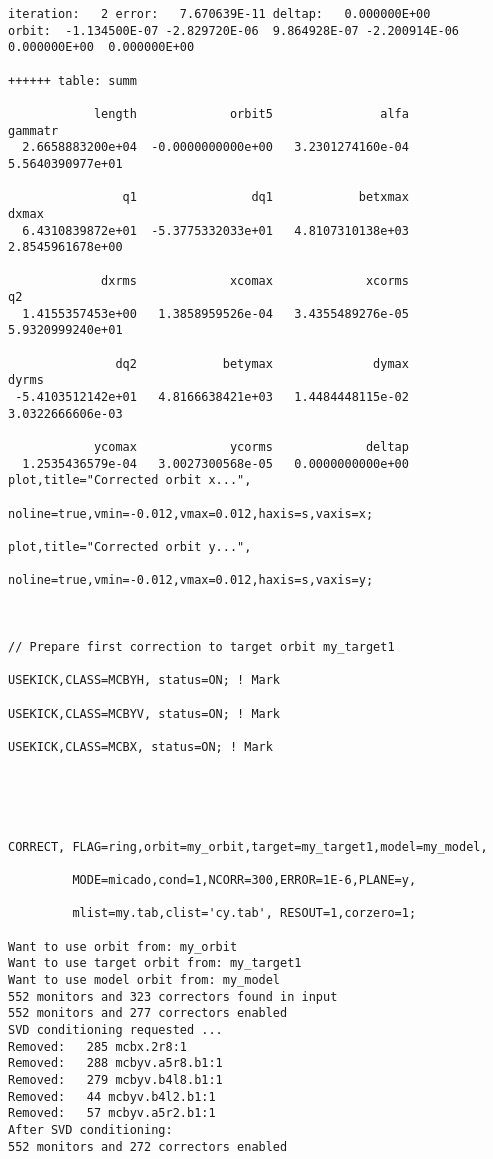 \begin{verbatim}
iteration:   2 error:   7.670639E-11 deltap:   0.000000E+00
orbit:  -1.134500E-07 -2.829720E-06  9.864928E-07 -2.200914E-06  0.000000E+00  0.000000E+00

++++++ table: summ

            length             orbit5               alfa            gammatr 
  2.6658883200e+04  -0.0000000000e+00   3.2301274160e-04   5.5640390977e+01 

                q1                dq1            betxmax              dxmax 
  6.4310839872e+01  -5.3775332033e+01   4.8107310138e+03   2.8545961678e+00 

             dxrms             xcomax             xcorms                 q2 
  1.4155357453e+00   1.3858959526e-04   3.4355489276e-05   5.9320999240e+01 

               dq2            betymax              dymax              dyrms 
 -5.4103512142e+01   4.8166638421e+03   1.4484448115e-02   3.0322666606e-03 

            ycomax             ycorms             deltap 
  1.2535436579e-04   3.0027300568e-05   0.0000000000e+00 
plot,title="Corrected orbit x...",

noline=true,vmin=-0.012,vmax=0.012,haxis=s,vaxis=x;

plot,title="Corrected orbit y...",

noline=true,vmin=-0.012,vmax=0.012,haxis=s,vaxis=y;



// Prepare first correction to target orbit my_target1

USEKICK,CLASS=MCBYH, status=ON; ! Mark

USEKICK,CLASS=MCBYV, status=ON; ! Mark

USEKICK,CLASS=MCBX, status=ON; ! Mark





CORRECT, FLAG=ring,orbit=my_orbit,target=my_target1,model=my_model,

         MODE=micado,cond=1,NCORR=300,ERROR=1E-6,PLANE=y,

         mlist=my.tab,clist='cy.tab', RESOUT=1,corzero=1;

Want to use orbit from: my_orbit
Want to use target orbit from: my_target1
Want to use model orbit from: my_model
552 monitors and 323 correctors found in input
552 monitors and 277 correctors enabled
SVD conditioning requested ...
Removed:   285 mcbx.2r8:1
Removed:   288 mcbyv.a5r8.b1:1
Removed:   279 mcbyv.b4l8.b1:1
Removed:   44 mcbyv.b4l2.b1:1
Removed:   57 mcbyv.a5r2.b1:1
After SVD conditioning:             
552 monitors and 272 correctors enabled


\end{verbatim}
